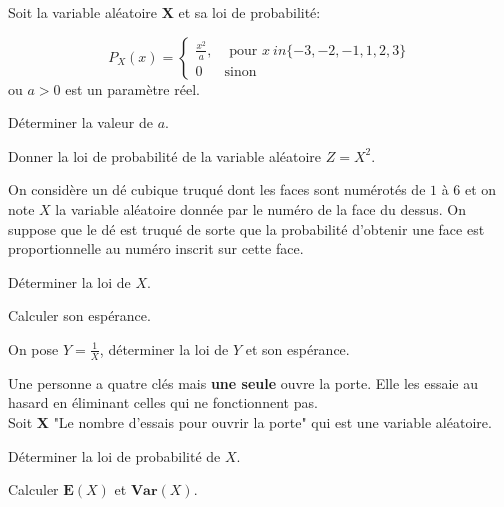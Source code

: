 \documentclass[11pt,largemargins]{homework}
\begin{document}
\maketitle


Soit la variable aléatoire $\mathbf{X}$  et sa loi de probabilité:

\begin{equation}
  P_X(x) = \begin{cases}
    \frac{x^2}{a},& \text{ pour } x \ in \{-3,-2,-1,1,2,3\}\\[4pt]
    0             & \text{sinon}
  \end{cases}
\end{equation}
ou $a > 0$ est un paramètre réel.

\begin{arabicparts}
    \item Déterminer la valeur de $a$.
    \item Donner la loi de probabilité de la variable aléatoire $Z = X^2$.
\end{arabicparts}

On considère un dé cubique truqué dont les faces sont numérotés de $1$ à $6$ et
on note $X$ la variable aléatoire donnée par le numéro de la face du dessus. On suppose que le dé est truqué de sorte que la probabilité d'obtenir une face est proportionnelle au numéro inscrit sur cette face.


\begin{arabicparts}
\item Déterminer la loi de $X$.
\item Calculer son espérance.
\item On pose $Y = \frac{1}{X}$, déterminer la loi de $Y$ et son espérance.
  
\end{arabicparts}



Une personne a quatre clés mais \textbf{une seule} ouvre la porte. Elle les
essaie au hasard en éliminant celles qui ne fonctionnent pas.\\

Soit \textbf{X} "Le nombre d'essais pour ouvrir la porte" qui est une variable
aléatoire.

\begin{arabicparts}
    \item Déterminer la loi de probabilité de $X$.
    \item Calculer $\mathbf{E}(X)$ et $\mathbf{Var}(X)$.
\end{arabicparts}
\end{document}
